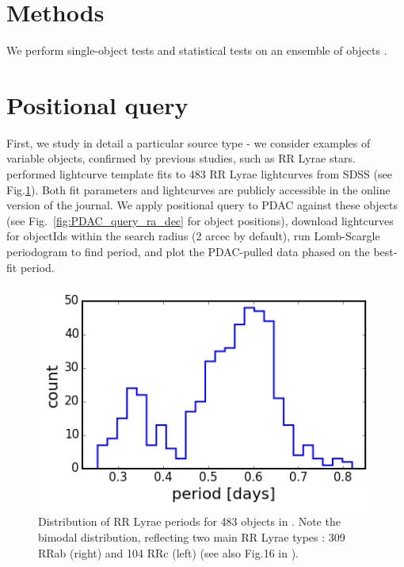 \documentclass[fleqn,usenatbib]{mnras} %
\begin{document}
\section{Methods}

We perform single-object tests and statistical tests on an ensemble of objects . 



\section{Positional query}
First, we study in detail a particular source type - we consider examples of variable objects, confirmed by previous studies, such as RR Lyrae stars. \cite{sesar2010}  performed lightcurve template fits to 483 RR Lyrae lightcurves from SDSS (see Fig.\ref{fig:RRLyr_distribution}). Both fit parameters and lightcurves are publicly accessible in the online version of the journal. We apply positional  query to PDAC against these objects (see Fig.~\ref{fig:PDAC_query_ra_dec} for object positions), download lightcurves for objectIds  within the search radius (2 arcec by default), run Lomb-Scargle periodogram to find period, and plot the PDAC-pulled data phased on the best-fit period. 

\begin{figure}
\includegraphics[width=\columnwidth]{figs/Fig_1_Sesar_2010_RRLyr}
\caption{ Distribution of RR Lyrae periods  for 483 objects in \citep{sesar2010}. Note the bimodal distribution, reflecting two main RR Lyrae types : 309 RRab (right) and 104 RRc (left) (see also Fig.16 in \citep{sesar2010}).}
\label{fig:RRLyr_distribution}
\end{figure}
\end{document}
